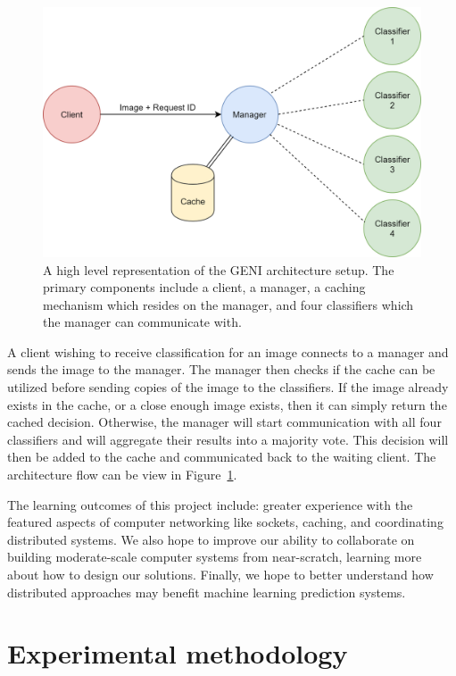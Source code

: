 \documentclass[11pt]{article}
\begin{document}
\begin{figure}
    \centering
    \includegraphics[scale=0.15]{networksArchitecture.png}
    \caption{A high level representation of the GENI architecture setup. The primary components include a client, a manager, a caching mechanism which resides on the manager, and four classifiers which the manager can communicate with.}
    \label{fig:architecture}
\end{figure}

A client wishing to receive classification for an image connects to a manager and sends the image to the manager. The manager then checks if the cache can be utilized before sending copies of the image to the classifiers. If the image already exists in the cache, or a close enough image exists, then it can simply return the cached decision. Otherwise, the manager will start communication with all four classifiers and will aggregate their results into a majority vote. This decision will then be added to the cache and communicated back to the waiting client. The architecture flow can be view in Figure~\ref{fig:architecture}.

The learning outcomes of this project include: greater experience with the featured aspects of computer networking like sockets, caching, and coordinating distributed systems.
We also hope to improve our ability to collaborate on building moderate-scale computer systems from near-scratch, learning more about how to design our solutions.
Finally, we hope to better understand how distributed approaches may benefit machine learning prediction systems.

\section{Experimental methodology}
\end{document}
